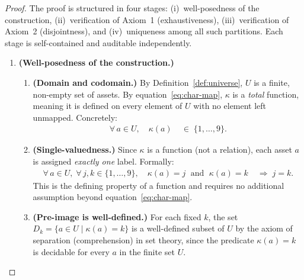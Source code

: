 \documentclass[12pt,openany]{book}
\newcommand{\calU}{\mathcal{U}}
\newcommand{\calD}{\mathcal{D}}
\numberwithin{equation}{chapter}
\theoremstyle{plain}
\theoremstyle{definition}
\theoremstyle{remark}
\def\calU{U}%
\def\calD{D}%
\def\mathcal#1{#1}%
\begin{document}
\begin{proof}
The proof is structured in four stages:
(i)~well-posedness of the construction,
(ii)~verification of Axiom~1 (exhaustiveness),
(iii)~verification of Axiom~2 (disjointness), and
(iv)~uniqueness among all such partitions.
Each stage is self-contained and auditable independently.

\begin{enumerate}

  \item \textbf{(Well-posedness of the construction.)}

  \begin{enumerate}

    \item \textbf{(Domain and codomain.)}
          By Definition~\ref{def:universe}, $\calU$ is a finite,
          non-empty set of assets.
          By equation~\eqref{eq:char-map}, $\kappa$ is a
          \emph{total} function, meaning it is defined on every
          element of $\calU$ with no element left unmapped.
          Concretely:
          \begin{align}
            \forall\, a \in \calU,
            \quad
            \kappa(a) &\;\in\; \{1,\ldots,9\}.
            \label{eq:kappa-total}
          \end{align}

    \item \textbf{(Single-valuedness.)}
          Since $\kappa$ is a function (not a relation), each asset
          $a$ is assigned \emph{exactly one} label.
          Formally:
          \begin{align}
            \forall\, a \in \calU,\;
            \forall\, j,k \in \{1,\ldots,9\},
            \quad
            \kappa(a) = j \;\text{ and }\; \kappa(a) = k
            &\;\Longrightarrow\; j = k.
            \label{eq:kappa-single}
          \end{align}
          This is the defining property of a function and requires
          no additional assumption beyond equation~\eqref{eq:char-map}.

    \item \textbf{(Pre-image is well-defined.)}
          For each fixed $k$, the set
          $\calD_k = \{a \in \calU \mid \kappa(a) = k\}$
          is a well-defined subset of $\calU$ by the
          axiom of separation (comprehension) in set theory,
          since the predicate $\kappa(a)=k$ is decidable for
          every $a$ in the finite set $\calU$.


\end{enumerate}
\end{enumerate}
\end{proof}
\end{document}
